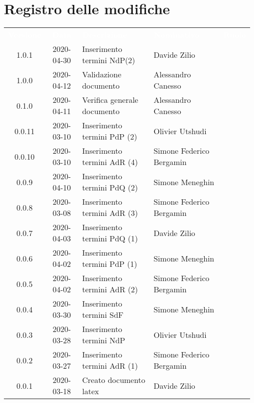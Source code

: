\section*{Registro delle modifiche}
{
	\centering
	\begin{longtable}{ c c  C{4cm} C{3cm} C{3.5cm} }
		\textcolor{white}{\textbf{Versione}} & \textcolor{white}{\textbf{Data}} & \textcolor{white}{\textbf{Descrizione}} & \textcolor{white}{\textbf{Nominativo}} & \textcolor{white}{\textbf{Ruolo}}\\
		1.0.1 & 2020-04-30 & Inserimento termini NdP(2) & Davide Zilio &\ana{} \\
		1.0.0 & 2020-04-12 & Validazione documento & Alessandro Canesso &\RdP{}\\
		0.1.0 & 2020-04-11 & Verifica generale documento & Alessandro Canesso &\ver{}\\
		0.0.11 & 2020-03-10 & Inserimento termini PdP (2) & Olivier Utshudi &\ana{}\\
		0.0.10 & 2020-03-10 & Inserimento termini AdR (4) & Simone Federico Bergamin &\ana{}\\
		0.0.9 & 2020-04-10 & Inserimento termini PdQ (2) & Simone Meneghin &\ana{}\\
		0.0.8 & 2020-03-08 & Inserimento termini AdR (3) & Simone Federico Bergamin &\ana{}\\
		0.0.7 & 2020-04-03 & Inserimento termini PdQ (1) & Davide Zilio &\ana{}\\
		0.0.6 & 2020-04-02 & Inserimento termini PdP (1) & Simone Meneghin &\ana{}\\
		0.0.5 & 2020-04-02 & Inserimento termini AdR (2) & Simone Federico Bergamin &\ana{}\\
		0.0.4 & 2020-03-30 & Inserimento termini SdF & Simone Meneghin &\ana{}\\
		0.0.3 & 2020-03-28 & Inserimento termini NdP & Olivier Utshudi &\ana{}\\
		0.0.2 & 2020-03-27 & Inserimento termini AdR (1) & Simone Federico Bergamin &\ana{}\\
		0.0.1 & 2020-03-18 & Creato documento latex & Davide Zilio &\ana{}\\		
		
	\end{longtable}

}